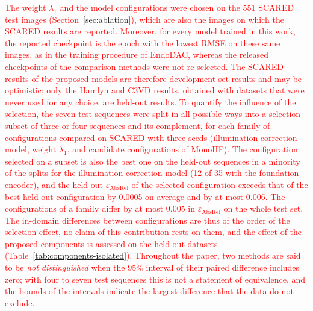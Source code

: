 \documentclass[a4paper,fleqn]{cas-dc}
\begin{document}
{\textcolor{red}{ The weight $\lambda_1$ and the model configurations were chosen on the 551 SCARED test images (Section~\ref{sec:ablation}), which are also the images on which the SCARED results are reported. Moreover, for every model trained in this work, the reported checkpoint is the epoch with the lowest RMSE on these same images, as in the training procedure of EndoDAC, whereas the released checkpoints of the comparison methods were not re-selected. The SCARED results of the proposed models are therefore development-set results and may be optimistic; only the Hamlyn and C3VD results, obtained with datasets that were never used for any choice, are held-out results. To quantify the influence of the selection, the seven test sequences were split in all possible ways into a selection subset of three or four sequences and its complement, for each family of configurations compared on SCARED with three seeds (illumination correction model, weight $\lambda_1$, and candidate configurations of MonoIIF). The configuration selected on a subset is also the best one on the held-out sequences in a minority of the splits for the illumination correction model (12 of 35 with the foundation encoder), and the held-out $\varepsilon_\textrm{AbsRel}$ of the selected configuration exceeds that of the best held-out configuration by 0.0005 on average and by at most 0.006. The configurations of a family differ by at most 0.005 in $\varepsilon_\textrm{AbsRel}$ on the whole test set. The in-domain differences between configurations are thus of the order of the selection effect, no claim of this contribution rests on them, and the effect of the proposed components is assessed on the held-out datasets (Table~\ref{tab:components-isolated}). Throughout the paper, two methods are said to be \emph{not distinguished} when the 95\% interval of their paired difference includes zero; with four to seven test sequences this is not a statement of equivalence, and the bounds of the intervals indicate the largest difference that the data do not exclude.}

}
\end{document}
